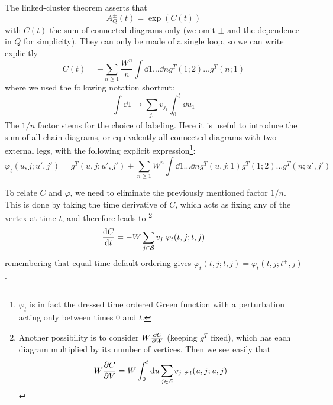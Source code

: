 \documentclass[12pt]{article}
\begin{document}
The linked-cluster theorem asserts that
\begin{equation}
	A^{\pm}_Q(t) = \exp(C(t))
\end{equation}
with $C(t)$ the sum of connected diagrams only (we omit $\pm$ and the dependence in $Q$ for simplicity). They can only be made of a single loop, so we can write explicitly
\begin{equation}
	C(t) = - \sum_{n \ge 1} \frac{W^n}{n} \int \dd{1} \ldots \dd{n} g^T(1; 2) \ldots g^T(n; 1)
\end{equation}
where we used the following notation shortcut:
\begin{equation}
	\int \dd{1} \rightarrow \sum_{j_1} v_{j_1} \int_0^t \dd{u_1}
\end{equation}
The $1/n$ factor stems for the choice of labeling.
Here it is useful to introduce the sum of all chain diagrams, or equivalently all connected diagrams with two external legs, with the following explicit expression\footnote{$\varphi_t$ is in fact the dressed time ordered Green function with a perturbation acting only between times $0$ and $t$.}:
\begin{equation}
	\varphi_t(u, j; u', j') = g^T(u, j; u', j') + \sum_{n \ge 1} W^n \int \dd{1} \ldots \dd{n} g^T(u, j; 1) g^T(1; 2) \ldots g^T(n; u', j')
\end{equation}

To relate $C$ and $\varphi$, we need to eliminate the previously mentioned factor $1/n$. 
This is done by taking the time derivative of $C$, which acts as fixing any of the vertex at time $t$, and therefore leads to%
\footnote{
Another possibility is to consider $W \pdv{C}{W}$ (keeping $g^T$ fixed), which has each diagram multiplied by its number of vertices. Then we see easily that
\begin{equation}
	W \pdv{C}{V} = W \int_0^t \dd{u} \sum_{j \in \mathcal{S}} v_j \; \varphi_t(u, j; u, j)
\end{equation}
}
\begin{equation}
	\dv{C}{t} = -W \sum_{j \in \mathcal{S}} v_j \; \varphi_t(t, j; t, j)
\end{equation}
remembering that equal time default ordering gives $\varphi_t(t, j; t, j) = \varphi_t(t, j; t^+, j)$.
\end{document}
